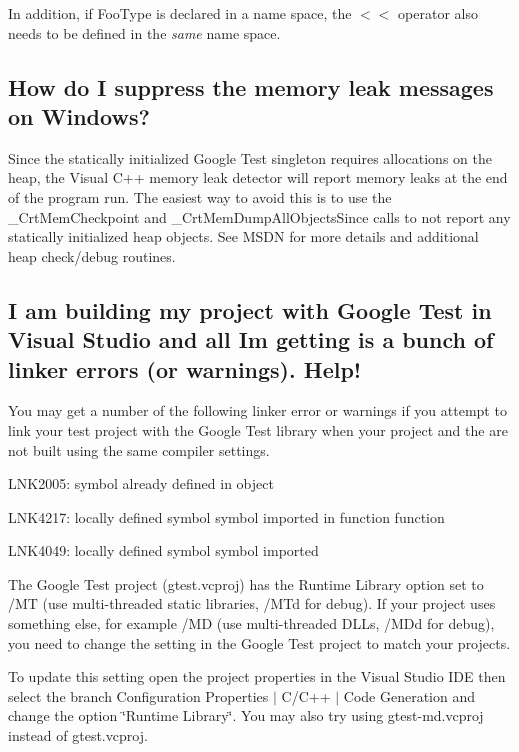 In addition, if {\ttfamily Foo\+Type} is declared in a name space, the {\ttfamily $<$$<$} operator also needs to be defined in the {\itshape same} name space.

\subsection*{How do I suppress the memory leak messages on Windows?}

Since the statically initialized Google Test singleton requires allocations on the heap, the Visual C++ memory leak detector will report memory leaks at the end of the program run. The easiest way to avoid this is to use the {\ttfamily \+\_\+\+Crt\+Mem\+Checkpoint} and {\ttfamily \+\_\+\+Crt\+Mem\+Dump\+All\+Objects\+Since} calls to not report any statically initialized heap objects. See M\+S\+DN for more details and additional heap check/debug routines.

\subsection*{I am building my project with Google Test in Visual Studio and all I\textquotesingle{}m getting is a bunch of linker errors (or warnings). Help!}

You may get a number of the following linker error or warnings if you attempt to link your test project with the Google Test library when your project and the are not built using the same compiler settings.


\begin{DoxyItemize}
\item L\+N\+K2005\+: symbol already defined in object
\item L\+N\+K4217\+: locally defined symbol \textquotesingle{}symbol\textquotesingle{} imported in function \textquotesingle{}function\textquotesingle{}
\item L\+N\+K4049\+: locally defined symbol \textquotesingle{}symbol\textquotesingle{} imported
\end{DoxyItemize}

The Google Test project (gtest.\+vcproj) has the Runtime Library option set to /\+MT (use multi-\/threaded static libraries, /\+M\+Td for debug). If your project uses something else, for example /\+MD (use multi-\/threaded D\+L\+Ls, /\+M\+Dd for debug), you need to change the setting in the Google Test project to match your project\textquotesingle{}s.

To update this setting open the project properties in the Visual Studio I\+DE then select the branch Configuration Properties $\vert$ C/\+C++ $\vert$ Code Generation and change the option \char`\"{}\+Runtime Library\char`\"{}. You may also try using gtest-\/md.\+vcproj instead of gtest.\+vcproj.


